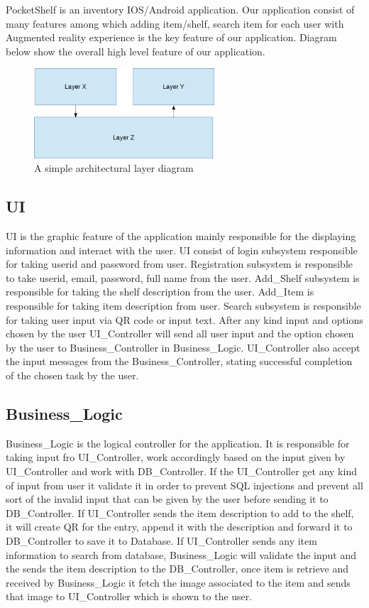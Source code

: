PocketShelf is an inventory IOS/Android application. Our application consist of many features among which adding item/shelf, search item for each user with Augmented reality experience is the key feature of our application. Diagram below show the overall high level feature of our application.


\begin{figure}[h!]
	\centering
 	\includegraphics[width=0.60\textwidth]{images/layers}
 \caption{A simple architectural layer diagram}
\end{figure}

\subsection{UI}
UI is the graphic feature of the application mainly responsible for the displaying information and interact with the user. UI consist of login subsystem responsible for taking userid and password from user. Registration subsystem is responsible to take userid, email, password, full name from the user. Add\_Shelf subsystem is responsible for taking the shelf description from the user. Add\_Item is responsible for taking item description from user. Search subsystem is responsible for taking user input via QR code or input text. After any kind input and options chosen by the user UI\_Controller will send all user input and the option chosen by the user to Business\_Controller in Business\_Logic. UI\_Controller also accept the input messages from the Business\_Controller, stating successful completion of the chosen task by the user.

\subsection{Business\_Logic}
Business\_Logic is the logical controller for the application. It is responsible for taking input fro UI\_Controller, work accordingly based on the input given by UI\_Controller and work with DB\_Controller. If the UI\_Controller get any kind of input from user it validate it in order to prevent SQL injections and prevent all sort of the invalid input that can be given by the user before sending it to DB\_Controller. If UI\_Controller sends the item description to add to the shelf, it will create QR for the entry, append it with the description and forward it to DB\_Controller to save it to Database. If UI\_Controller sends any item information to search from database, Business\_Logic will validate the input and the sends the item description to the DB\_Controller, once item is retrieve and received by Business\_Logic it fetch the image associated to the item and sends that image to UI\_Controller which is shown to the user.


